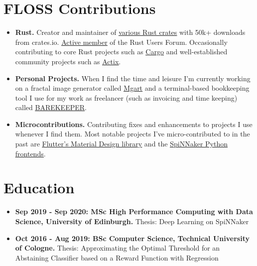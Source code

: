 \documentclass[10pt]{article}
\begin{document}
\section*{FLOSS Contributions}

\begin{itemize}[label={}, leftmargin=*]

\item \textbf{Rust.} Creator and maintainer of
  \underline{\href{https://crates.io/users/jofas}{various Rust crates}}
  with 50k+ downloads from crates.io.
  \underline{\href{https://users.rust-lang.org/u/jofas/summary}{Active member}}
  of the Rust Users Forum.
  Occasionally contributing to core Rust projects such as
  \underline{\href{https://github.com/rust-lang/cargo}{Cargo}} and
  well-established community projects such as
  \underline{\href{https://github.com/actix/}{Actix}}.

\item \textbf{Personal Projects.} When I find the time and leisure I'm
  currently working on a fractal image generator called
  \underline{\href{https://github.com/jofas/mgart}{Mgart}}
  and a terminal-based bookkeeping tool I use for my work as
  freelancer (such as invoicing and time keeping) called
  \underline{\href{https://github.com/jofas/BAREKEEPER}{BAREKEEPER}}.

\item \textbf{Microcontributions.} Contributing fixes and enhancements
  to projects I use whenever I find them.
  Most notable projects I've micro-contributed to in the past are
  \underline{\href{https://github.com/flutter/flutter}{Flutter's Material Design library}}
  and the
  \underline{\href{https://github.com/SpiNNakerManchester}{SpiNNaker Python frontends}}.

\end{itemize}

\section*{Education}

\begin{itemize}[label={}, leftmargin=*]

\item \textbf{Sep 2019 - Sep 2020: MSc High Performance Computing with Data
  Science, University of Edinburgh.} Thesis: Deep Learning on SpiNNaker

\item \textbf{Oct 2016 - Aug 2019: BSc Computer Science, Technical
  University of Cologne.} Thesis: Approximating the Optimal Threshold
  for an Abstaining Classifier based on a Reward Function with Regression

\end{itemize}
\end{document}
